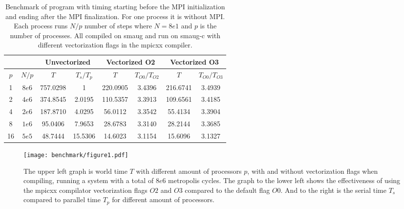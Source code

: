 %

\begin{table}[H]
  \centering
  \begin{tabular}{cc|cc|cc|cc}
    &&\multicolumn{2}{c}{Unvectorized} & \multicolumn{2}{c}{Vectorized O2} &%
    \multicolumn{2}{c}{Vectorized O3}\\\hline
    $p$ & $N/p$ & $T $     & $T_{s}/T_{p}$ & $T$       & $T_{O0}/T_{O2}$ & $T$      & $T_{O0}/T_{O3}$ \\\hline
    1   & $8e6$ & 757.0298 &  1            & 220.0905  & 3.4396          & 216.6741 & 3.4939 \\
    2   & $4e6$ & 374.8545 &  2.0195       & 110.5357  & 3.3913          & 109.6561 & 3.4185 \\  
    4   & $2e6$ & 187.8710 &  4.0295       &  56.0112  & 3.3542          &  55.4134 & 3.3904 \\
    8   & $1e6$ &  95.0406 &  7.9653       &  28.6783  & 3.3140          &  28.2144 & 3.3685 \\
    16  & $5e5$ &  48.7444 & 15.5306       &  14.6023  & 3.1154          &  15.6096 & 3.1327 
  \end{tabular}
  \caption{%
           Benchmark of program with timing starting before the MPI initialization %
           and ending after the MPI finalization. For one process it is without %
           MPI. Each process runs $N/p$ number of steps where $N=8e1$ and $p$ is %
           the number of processes. %
           All compiled on smaug and run on smaug-c with different vectorization %
           flags in the mpicxx compiler. %
         }
  \label{tab:bench}
\end{table}

\begin{figure}[H]
  \centering
  \texttt{[image: benchmark/figure1.pdf]}
  \caption{%
           The upper left graph is world time $T$ with different amount of processors $p$, %
           with and without vectorization flags when compiling, running a system with %
           a total of $8e6$ metropolis cycles. The graph to the lower left shows the %
           effectiveness of using the mpicxx compilator vectorization flags $O2$ and %
           $O3$ compared to the default flag $O0$. And to the right is the serial time %
           $T_s$ compared to parallel time $T_p$ for different amount of processors. %
         }
  \label{fig:bench}
\end{figure}
%
